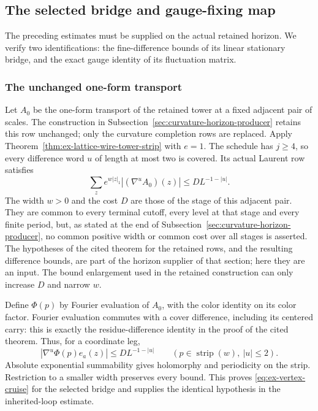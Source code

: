 \subsection{The selected bridge and gauge-fixing map}
\label{sec:ex-selected-stationary-linear-data}

The preceding estimates must be supplied on the actual retained horizon.
We verify two identifications: the fine-difference bounds of its linear
stationary bridge, and the exact gauge identity of its fluctuation matrix.

\subsubsection{The unchanged one-form transport}
Let $A_0$ be the one-form transport of the retained tower at a fixed
adjacent pair of scales. The construction in
Subsection~\ref{sec:curvature-horizon-producer} retains this row unchanged;
only the curvature completion rows are replaced. Apply
Theorem~\ref{thm:ex-lattice-wire-tower-strip} with $e=1$. The schedule
has $j\geq4$, so every difference word $u$ of length at most two is
covered. Its actual Laurent row satisfies
\[
       \sum_z e^{w|z|_1}|(\nabla^u A_0)(z)|
                         \leq D L^{-1-|u|}.
\]
The width $w>0$ and the cost $D$ are those of the stage of this
adjacent pair. They are common to every terminal cutoff, every level
at that stage and every finite period, but, as stated at the end of
Subsection~\ref{sec:curvature-horizon-producer}, no common positive width
or common cost over all stages is asserted. The hypotheses of the cited
theorem for the retained rows, and the resulting difference bounds, are
part of the horizon supplier of that section; here they are an input.
The bound enlargement used in the retained construction can only
increase $D$ and narrow $w$.

Define $\Phi(p)$ by Fourier evaluation of $A_0$, with the color identity
on its color factor. Fourier evaluation commutes with a cover difference,
including its centered carry: this is exactly the residue-difference
identity in the proof of the cited theorem. Thus, for a coordinate leg,
\[
       |\nabla^u\Phi(p)e_a(z)|\leq D L^{-1-|u|}
                      \qquad (p\in\operatorname{strip}(w),\ |u|\leq2).
\]
Absolute exponential summability gives holomorphy and periodicity on the
strip. Restriction to a smaller width preserves every bound. This proves
\eqref{eq:ex-vertex-cruise} for the selected bridge and supplies the
identical hypothesis in the inherited-loop estimate.

